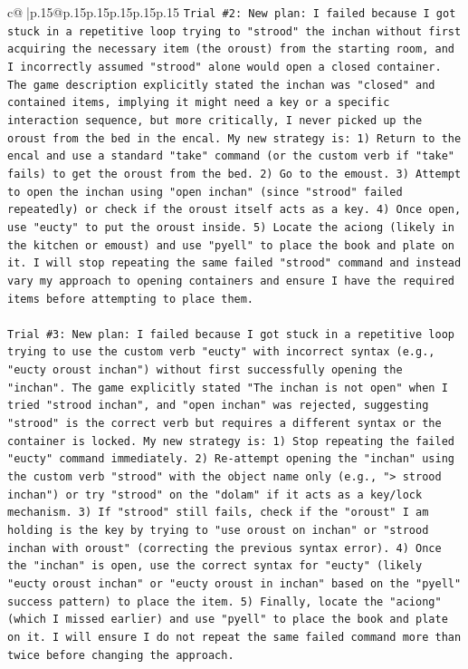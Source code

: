 \documentclass{article}
\begin{document}
{\begin{supertabular}{c@{$\;$}|p{.15\linewidth}@{}p{.15\linewidth}p{.15\linewidth}p{.15\linewidth}p{.15\linewidth}p{.15\linewidth}}
{{{\texttt{Trial \#2: New plan: I failed because I got stuck in a repetitive loop trying to "strood" the inchan without first acquiring the necessary item (the oroust) from the starting room, and I incorrectly assumed "strood" alone would open a closed container. The game description explicitly stated the inchan was "closed" and contained items, implying it might need a key or a specific interaction sequence, but more critically, I never picked up the oroust from the bed in the encal. My new strategy is: 1) Return to the encal and use a standard "take" command (or the custom verb if "take" fails) to get the oroust from the bed. 2) Go to the emoust. 3) Attempt to open the inchan using "open inchan" (since "strood" failed repeatedly) or check if the oroust itself acts as a key. 4) Once open, use "eucty" to put the oroust inside. 5) Locate the aciong (likely in the kitchen or emoust) and use "pyell" to place the book and plate on it. I will stop repeating the same failed "strood" command and instead vary my approach to opening containers and ensure I have the required items before attempting to place them.} \\
\\ 
\texttt{Trial \#3: New plan: I failed because I got stuck in a repetitive loop trying to use the custom verb "eucty" with incorrect syntax (e.g., "eucty oroust inchan") without first successfully opening the "inchan". The game explicitly stated "The inchan is not open" when I tried "strood inchan", and "open inchan" was rejected, suggesting "strood" is the correct verb but requires a different syntax or the container is locked. My new strategy is: 1) Stop repeating the failed "eucty" command immediately. 2) Re{-}attempt opening the "inchan" using the custom verb "strood" with the object name only (e.g., "> strood inchan") or try "strood" on the "dolam" if it acts as a key/lock mechanism. 3) If "strood" still fails, check if the "oroust" I am holding is the key by trying to "use oroust on inchan" or "strood inchan with oroust" (correcting the previous syntax error). 4) Once the "inchan" is open, use the correct syntax for "eucty" (likely "eucty oroust inchan" or "eucty oroust in inchan" based on the "pyell" success pattern) to place the item. 5) Finally, locate the "aciong" (which I missed earlier) and use "pyell" to place the book and plate on it. I will ensure I do not repeat the same failed command more than twice before changing the approach.} \\
\\ 
\\ 
}}}
\end{supertabular}}
\end{document}
